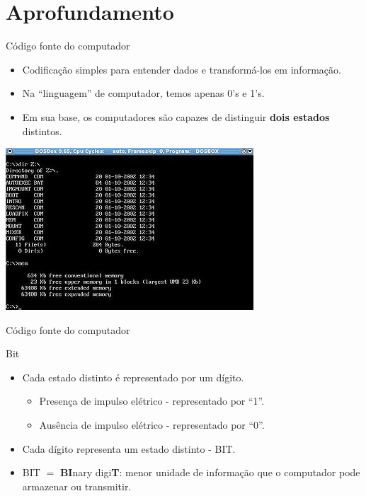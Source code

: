 \section{Aprofundamento}

\begin{frame}{Código fonte do computador}
	\begin{block}{}
		\begin{itemize}
			\item Codificação simples para entender dados e transformá-los em informação.
			\item Na “linguagem” de computador, temos apenas 0's e 1's.
			\item Em sua base, os computadores são capazes de distinguir \textbf{dois estados} distintos.
		\end{itemize}
	\end{block}

	\centering
	\includegraphics[width=0.6\linewidth]{Figuras/Ch02/fig1}
\end{frame}


\begin{frame}{Código fonte do computador}
	\begin{block}{Bit}
		\begin{itemize}
			\item Cada estado distinto é representado por um dígito.
			      \begin{itemize}
				      \item\normalsize Presença de impulso elétrico - representado por ``1''.
				      \item\normalsize Ausência de impulso elétrico - representado por ``0''.
			      \end{itemize}
			\item Cada dígito representa um estado distinto - BIT.
			\item BIT $ = $ \textbf{BI}nary digi\textbf{T}: menor unidade de informação que o computador pode armazenar ou transmitir.
		\end{itemize}
	\end{block}

\end{frame}


